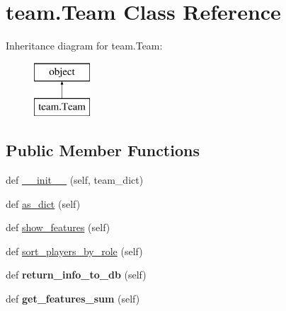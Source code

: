 \hypertarget{classteam_1_1_team}{}\section{team.\+Team Class Reference}
\label{classteam_1_1_team}
Inheritance diagram for team.\+Team\+:\begin{figure}[H]
\begin{center}
\leavevmode
\includegraphics[height=2.000000cm]{classteam_1_1_team}
\end{center}
\end{figure}
\subsection*{Public Member Functions}
\begin{DoxyCompactItemize}
\item 
def \hyperlink{classteam_1_1_team_af834639269e343fbacc3d99e815e032f}{\+\_\+\+\_\+init\+\_\+\+\_\+} (self, team\+\_\+dict)
\item 
def \hyperlink{classteam_1_1_team_aab666e3bf7955f682b49898f251b81e4}{as\+\_\+dict} (self)
\item 
def \hyperlink{classteam_1_1_team_a74cff94194e1af6154dfdd7215423e24}{show\+\_\+features} (self)
\item 
def \hyperlink{classteam_1_1_team_af64128503d74e76b9ba76598faae292c}{sort\+\_\+players\+\_\+by\+\_\+role} (self)
\item 
def {\bfseries return\+\_\+info\+\_\+to\+\_\+db} (self)\hypertarget{classteam_1_1_team_a49df92cb20425e8e128c895c92d85662}{}\label{classteam_1_1_team_a49df92cb20425e8e128c895c92d85662}

\item 
def {\bfseries get\+\_\+features\+\_\+sum} (self)\hypertarget{classteam_1_1_team_aa8986fa35041bc005111a580b80aff8a}{}\label{classteam_1_1_team_aa8986fa35041bc005111a580b80aff8a}

\end{DoxyCompactItemize}

